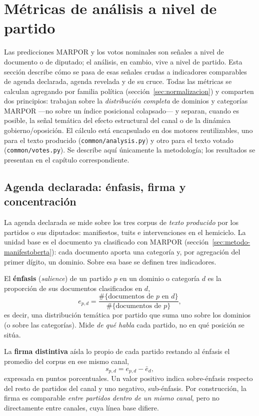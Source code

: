 \section{Métricas de análisis a nivel de partido}
\label{sec:metricas}

Las predicciones MARPOR y los votos nominales son señales a nivel de documento o
de diputado; el análisis, en cambio, vive a nivel de partido. Esta sección
describe cómo se pasa de esas señales crudas a indicadores comparables de agenda
declarada, agenda revelada y de su cruce. Todas las métricas se calculan
agregando por familia política (sección~\ref{sec:normalizacion}) y comparten dos
principios: trabajan sobre la \emph{distribución completa} de dominios y
categorías MARPOR ---no sobre un índice posicional colapsado--- y separan, cuando
es posible, la señal temática del efecto estructural del canal o de la dinámica
gobierno/oposición. El cálculo está encapsulado en dos motores reutilizables,
uno para el texto producido (\texttt{common/analysis.py}) y otro para el texto
votado (\texttt{common/votes.py}). Se describe aquí únicamente la metodología;
los resultados se presentan en el capítulo correspondiente.

\subsection{Agenda declarada: énfasis, firma y concentración}
\label{sec:metricas-declarada}

La agenda declarada se mide sobre los tres corpus de \emph{texto producido} por
los partidos o sus diputados: manifiestos, tuits e intervenciones en el
hemiciclo. La unidad base es el documento ya clasificado con MARPOR
(sección~\ref{sec:metodo-manifestoberta}): cada documento aporta una categoría y,
por agregación del primer dígito, un dominio. Sobre esa base se definen tres
indicadores.

El \textbf{énfasis} (\emph{salience}) de un partido $p$ en un dominio o categoría
$d$ es la proporción de sus documentos clasificados en $d$,
\[
e_{p,d} = \frac{\#\{\text{documentos de } p \text{ en } d\}}{\#\{\text{documentos de } p\}},
\]
es decir, una distribución temática por partido que suma uno sobre los dominios
(o sobre las categorías). Mide \emph{de qué habla} cada partido, no en qué
posición se sitúa.

La \textbf{firma distintiva} aísla lo propio de cada partido restando al énfasis
el promedio del corpus en ese mismo canal,
\[
s_{p,d} = e_{p,d} - \bar{e}_{d},
\]
expresada en puntos porcentuales. Un valor positivo indica sobre-énfasis
respecto del resto de partidos del canal y uno negativo, sub-énfasis. Por
construcción, la firma es comparable \emph{entre partidos dentro de un mismo
canal}, pero no directamente entre canales, cuya línea base difiere.

